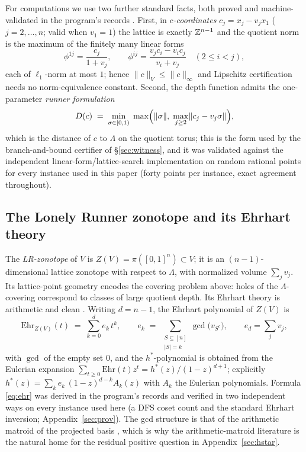 For computations we use two further standard facts, both proved and
machine-validated in the program's records \cite{prog-artifacts}. First,
in \emph{$c$-coordinates} $c_j=x_j-v_jx_1$ ($j=2,\dots,n$; valid when
$v_1=1$) the lattice is exactly $\mathbb{Z}^{n-1}$ and the quotient norm is the
maximum of the finitely many linear forms
\[
\phi^{1j}=\frac{c_j}{1+v_j},\qquad
\phi^{ij}=\frac{v_jc_i-v_ic_j}{v_i+v_j}\quad(2\le i<j),
\]
each of $\ell_1$-norm at most $1$; hence
$\|c\|_V\le\|c\|_\infty$ and Lipschitz certification needs no
norm-equivalence constant. Second, the depth function admits the
one-parameter \emph{runner formulation}
\begin{equation}\label{eq:runnerform}
D(c)\;=\;\min_{\sigma\in[0,1)}\;\max\Bigl(\lVert \sigma \rVert,\;
\max_{j\ge 2}\lVert c_j-v_j\sigma \rVert\Bigr),
\end{equation}
which is the distance of $c$ to $\Lambda$ on the quotient torus; this is
the form used by the branch-and-bound certifier of \S\ref{sec:witness},
and it was validated against the independent linear-form/lattice-search
implementation on random rational points for every instance used in this
paper (forty points per instance, exact agreement throughout).

\subsection{The Lonely Runner zonotope and its Ehrhart theory}

The \emph{LR-zonotope} of $V$ is $Z(V)=\pi([0,1]^n)\subset V$; it is an
$(n{-}1)$-dimensional lattice zonotope with respect to $\Lambda$, with
normalized volume $\sum_j v_j$. Its lattice-point geometry encodes the
covering problem above: holes of the $\Lambda$-covering correspond to
classes of large quotient depth. Its Ehrhart theory is arithmetic and
clean \cite{BeckRobins,dAMoci,StanleyEC}. Writing $d=n-1$, the Ehrhart
polynomial of $Z(V)$ is
\begin{equation}\label{eq:ehr}
\mathrm{Ehr}_{Z(V)}(t)\;=\;\sum_{k=0}^{d} e_k\,t^k,\qquad
e_k\;=\;\sum_{\substack{S\subseteq[n]\\|S|=k}}\gcd\!\bigl(v_{S^c}\bigr),
\qquad e_d=\sum_j v_j,
\end{equation}
with $\gcd$ of the empty set $0$, and the $h^*$-polynomial is obtained
from the Eulerian expansion
$\sum_{t\ge0}\mathrm{Ehr}(t)z^t=h^*(z)/(1-z)^{d+1}$; explicitly
$h^*(z)=\sum_k e_k\,(1-z)^{d-k}A_k(z)$ with $A_k$ the Eulerian
polynomials. Formula \eqref{eq:ehr} was derived in the program's records
and verified in two independent ways on every instance used here (a DFS
coset count and the standard Ehrhart inversion;
Appendix~\ref{sec:prov}). The gcd structure is that of the arithmetic
matroid of the projected basis \cite{dAMoci}, which is why the
arithmetic-matroid literature is the natural home for the residual
positive question in Appendix~\ref{sec:hstar}.

